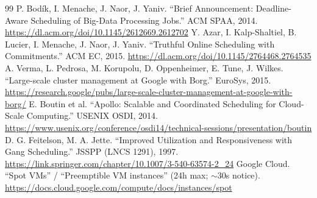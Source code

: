 \documentclass{article}
\begin{document}
\begin{thebibliography}{99}
 P. Bod\'ik, I. Menache, J. Naor, J. Yaniv. ``Brief Announcement: Deadline-Aware Scheduling of Big-Data Processing Jobs.'' ACM SPAA, 2014. \url{https://dl.acm.org/doi/10.1145/2612669.2612702}
 Y. Azar, I. Kalp-Shaltiel, B. Lucier, I. Menache, J. Naor, J. Yaniv. ``Truthful Online Scheduling with Commitments.'' ACM EC, 2015. \url{https://dl.acm.org/doi/10.1145/2764468.2764535}
 A. Verma, L. Pedrosa, M. Korupolu, D. Oppenheimer, E. Tune, J. Wilkes. ``Large-scale cluster management at Google with Borg.'' EuroSys, 2015. \url{https://research.google/pubs/large-scale-cluster-management-at-google-with-borg/}
 E. Boutin et al. ``Apollo: Scalable and Coordinated Scheduling for Cloud-Scale Computing.'' USENIX OSDI, 2014. \url{https://www.usenix.org/conference/osdi14/technical-sessions/presentation/boutin}
 D. G. Feitelson, M. A. Jette. ``Improved Utilization and Responsiveness with Gang Scheduling.'' JSSPP (LNCS 1291), 1997. \url{https://link.springer.com/chapter/10.1007/3-540-63574-2_24}
 Google Cloud. ``Spot VMs'' / ``Preemptible VM instances'' (24h max; $\sim$30s notice). \url{https://docs.cloud.google.com/compute/docs/instances/spot}

\end{thebibliography}
\end{document}
